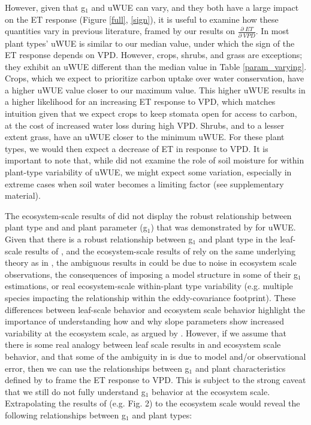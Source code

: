 \documentclass[12pt]{article}
\begin{document}
However, given that g$_1$ and uWUE can vary, and they both have a
large impact on the ET response (Figure \ref{full}, \ref{sign}), it is
useful to examine how these quantities vary in previous literature,
framed by our results on $\frac{\partial \; ET}{\partial \; VPD}$. In
 most plant types' uWUE is similar to our median
value, under which the sign of the ET response depends on
VPD. However, crops, shrubs, and grass are exceptions; they exhibit an
uWUE different than the median value in Table
\ref{param_varying}. Crops, which we expect to prioritize carbon
uptake over water conservation, have a higher uWUE value closer to our
maximum value. This higher uWUE results in a higher likelihood for an
increasing ET response to VPD, which matches intuition given that we
expect crops to keep stomata open for access to carbon, at the cost of
increased water loss during high VPD. Shrubs, and to a lesser extent
grass, have an uWUE closer to the minimum uWUE. For these plant types,
we would then expect a decrease of ET in response to VPD. It is
important to note that, while  did not examine the
role of soil moisture for within plant-type variability of uWUE, we
might expect some variation, especially in extreme cases when soil
water becomes a limiting factor (see supplementary material).

The ecosystem-scale results of  did not display the
robust relationship between plant type and and plant parameter (g$_1$)
that was demonstrated by  for uWUE. Given that there
is a robust relationship between g$_1$ and plant type in the
leaf-scale results of , and the ecosystem-scale
results of  rely on the same underlying theory as in
, the ambiguous results in 
could be due to noise in ecosystem scale observations, the
consequences of imposing a model structure in some of their g$_1$
estimations, or real ecosystem-scale within-plant type variability
(e.g. multiple species impacting the relationship within the
eddy-covariance footprint). These differences between leaf-scale
behavior and ecosystem scale behavior highlight the importance of
understanding how and why slope parameters show increased variability
at the ecosystem scale, as argued by . However, if
we assume that there is some real analogy between leaf scale results
in  and ecosystem scale behavior, and that some of the
ambiguity in  is due to model and/or observational
error, then we can use the relationships between g$_1$ and plant
characteristics defined by  to frame the ET response
to VPD. This is subject to the strong caveat that we still do not
fully understand g$_1$ behavior at the ecosystem scale. Extrapolating
the results of  (e.g. Fig. 2) to the ecosystem scale
would reveal the following relationships between g$_1$ and plant
types:
\end{document}
